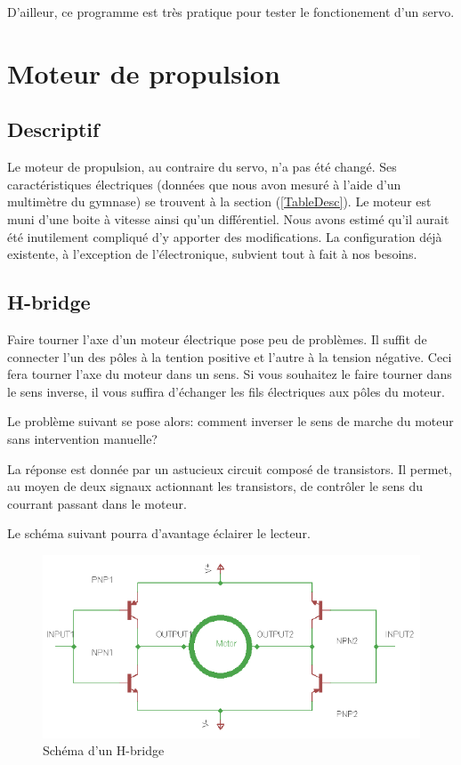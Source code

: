 \documentclass[a4paper,12pt]{report}
\begin{document}
{D'ailleur, ce programme est tr\`es pratique pour tester le fonctionement d'un servo. 

\section{Moteur de propulsion}

\subsection{Descriptif}

Le moteur de propulsion, au contraire du servo, n'a pas été changé.
 Ses caract\'eristiques \'electriques (donn\'ees que nous avon mesur\'e \`a l'aide
d'un multim\`etre du gymnase) se trouvent \`a la section
(\ref{TableDesc}). Le moteur est muni d'une boite \`a vitesse ainsi qu'un
diff\'erentiel. Nous avons estim\'e qu'il aurait \'et\'e
inutilement compliqu\'e d'y apporter des modifications. La
configuration d\'ej\`a existente, \`a l'exception de l'\'electronique,
subvient tout \`a fait \`a nos besoins.  

\subsection{H-bridge}
Faire tourner l'axe d'un moteur \'electrique pose peu de probl\`emes. Il
suffit de connecter l'un des p\^oles \`a la tention positive et l'autre \`a la tension
n\'egative. Ceci fera tourner l'axe du moteur dans un sens. Si vous souhaitez le
faire tourner dans le sens inverse, il vous suffira d'\'echanger les fils
\'electriques aux p\^oles du moteur.

Le probl\`eme suivant se pose alors: comment inverser le sens de marche du
moteur sans intervention manuelle?

La r\'eponse est donn\'ee par un astucieux circuit compos\'e de
transistors. Il permet, au moyen de deux signaux actionnant les transistors,
de contr\^oler le sens du courrant passant dans le moteur.

Le sch\'ema suivant pourra d'avantage \'eclairer le lecteur.

\begin{figure}[h]
\centering
\includegraphics[width=1.0\textwidth]{figures/H-bridge}
    \caption{\label{H-bridge}Sch\'ema d'un H-bridge}
\end{figure}

}
\end{document}
